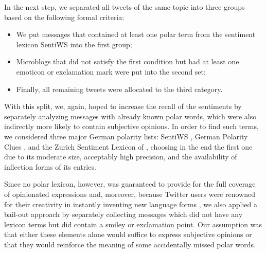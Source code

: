 




In the next step, we separated all tweets of the same topic into three
groups based on the following formal criteria:
\begin{itemize}
\item We put messages that contained at least one polar term from the
  sentiment lexicon SentiWS \cite{Remus:10} into the first group;
\item Microblogs that did not satisfy the first condition but had at
  least one emoticon or exclamation mark were put into the second set;
\item Finally, all remaining tweets were allocated to the third
  category.
\end{itemize}
With this split, we, again, hoped to increase the recall of the
sentiments by separately analyzing messages with already known polar
words, which were also indirectly more likely to contain subjective
opinions.  In order to find such terms, we considered three major
German polarity lists: SentiWS \cite{Remus:10}, German Polarity Clues
\cite{Waltinger:10}, and the Zurich Sentiment Lexicon of
\citet{Clematide:10}, choosing in the end the first one due to its
moderate size, acceptably high precision, and the availability of
inflection forms of its entries.

Since no polar lexicon, however, was guaranteed to provide for the
full coverage of opinionated expressions and, moreover, because
Twitter users were renowned for their creativity in instantly
inventing new language forms \cite[see][]{Eisenstein:13}, we also
applied a bail-out approach by separately collecting messages which
did not have any lexicon terms but did contain a smiley or exclamation
point.  Our assumption was that either these elements alone would
suffice to express subjective opinions or that they would reinforce
the meaning of some accidentally missed polar words.

